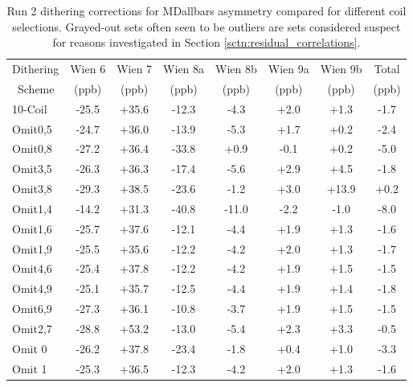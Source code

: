 \begin{table}[!h]

\caption{Run 2 dithering corrections for MDallbars asymmetry compared for different coil selections. Grayed-out sets often seen to be outliers are sets considered suspect for reasons investigated in Section \ref{sctn:residual_correlations}.}
\begin{center}
\begin{tabular}[h]{|l||c|c|c|c|c|c||c|}\hline
Dithering& Wien 6& Wien 7& Wien 8a& Wien 8b& Wien 9a& Wien 9b& Total\\
~Scheme&(ppb)&(ppb)&(ppb)&(ppb)&(ppb)&(ppb)&(ppb)\\\hline\hline
10-Coil& -25.5& +35.6& -12.3& -4.3& +2.0& +1.3& -1.7\\\hline
Omit0,5& -24.7& +36.0& -13.9& -5.3& +1.7& +0.2& -2.4\\\hline
{\color{Gray}Omit0,8}&{\color{Gray} -27.2}&{\color{Gray} +36.4}&{\color{Gray} -33.8}&{\color{Gray} +0.9}&{\color{Gray} -0.1}&{\color{Gray} +0.2}&{\color{Gray} -5.0}\\\hline
{\color{Gray}Omit3,5}&{\color{Gray} -26.3}&{\color{Gray} +36.3}&{\color{Gray} -17.4}&{\color{Gray} -5.6}&{\color{Gray} +2.9}&{\color{Gray} +4.5}&{\color{Gray} -1.8}\\\hline
{\color{Gray}Omit3,8}&{\color{Gray} -29.3}&{\color{Gray} +38.5}&{\color{Gray} -23.6}&{\color{Gray} -1.2}&{\color{Gray} +3.0}&{\color{Gray} +13.9}&{\color{Gray} +0.2}\\\hline
{\color{Gray}Omit1,4}&{\color{Gray} -14.2}&{\color{Gray} +31.3}&{\color{Gray} -40.8}&{\color{Gray} -11.0}&{\color{Gray} -2.2}&{\color{Gray} -1.0}&{\color{Gray} -8.0}\\\hline
Omit1,6& -25.7& +37.6& -12.1& -4.4& +1.9& +1.3& -1.6\\\hline
Omit1,9& -25.5& +35.6& -12.2& -4.2& +2.0& +1.3& -1.7\\\hline
Omit4,6& -25.4& +37.8& -12.2& -4.2& +1.9& +1.5& -1.5\\\hline
Omit4,9& -25.1& +35.7& -12.5& -4.4& +1.9& +1.4& -1.8\\\hline
Omit6,9& -27.3& +36.1& -10.8& -3.7& +1.9& +1.5& -1.5\\\hline
Omit2,7& -28.8& +53.2& -13.0& -5.4& +2.3& +3.3& -0.5\\\hline
{\color{Gray}Omit 0}&{\color{Gray} -26.2}&{\color{Gray} +37.8}&{\color{Gray} -23.4}&{\color{Gray} -1.8}&{\color{Gray} +0.4}&{\color{Gray} +1.0}&{\color{Gray} -3.3}\\\hline
Omit 1& -25.3& +36.5& -12.3& -4.2& +2.0& +1.3& -1.6\\\hline

\end{tabular}
\end{center}
\end{table}
